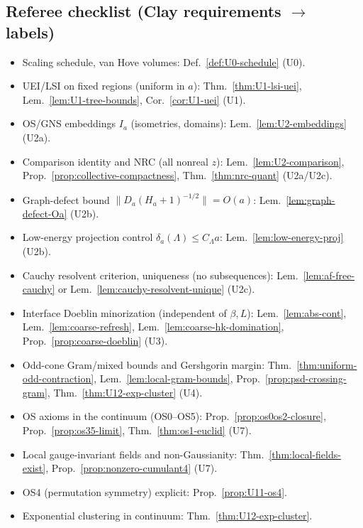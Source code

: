 \documentclass[11pt]{amsart}
\theoremstyle{plain}
\theoremstyle{definition}
\theoremstyle{remark}
\begin{document}
\subsection*{Referee checklist (Clay requirements $\to$ labels)}
\begin{itemize}
  \item Scaling schedule, van Hove volumes: Def.~\ref{def:U0-schedule} (U0).
  \item UEI/LSI on fixed regions (uniform in $a$): Thm.~\ref{thm:U1-lsi-uei}, Lem.~\ref{lem:U1-tree-bounds}, Cor.~\ref{cor:U1-uei} (U1).
  \item OS/GNS embeddings $I_a$ (isometries, domains): Lem.~\ref{lem:U2-embeddings} (U2a).
  \item Comparison identity and NRC (all nonreal $z$): Lem.~\ref{lem:U2-comparison}, Prop.~\ref{prop:collective-compactness}, Thm.~\ref{thm:nrc-quant} (U2a/U2c).
  \item Graph-defect bound $\|D_a(H_a+1)^{-1/2}\|=O(a)$: Lem.~\ref{lem:graph-defect-Oa} (U2b).
  \item Low-energy projection control $\delta_a(\Lambda)\le C_\Lambda a$: Lem.~\ref{lem:low-energy-proj} (U2b).
  \item Cauchy resolvent criterion, uniqueness (no subsequences): Lem.~\ref{lem:af-free-cauchy} or Lem.~\ref{lem:cauchy-resolvent-unique} (U2c).
  \item Interface Doeblin minorization (independent of $\beta,L$): Lem.~\ref{lem:abs-cont}, Lem.~\ref{lem:coarse-refresh}, Lem.~\ref{lem:coarse-hk-domination}, Prop.~\ref{prop:coarse-doeblin} (U3).
  \item Odd-cone Gram/mixed bounds and Gershgorin margin: Thm.~\ref{thm:uniform-odd-contraction}, Lem.~\ref{lem:local-gram-bounds}, Prop.~\ref{prop:psd-crossing-gram}, Thm.~\ref{thm:U12-exp-cluster} (U4).
  \item OS axioms in the continuum (OS0–OS5): Prop.~\ref{prop:os0os2-closure}, Prop.~\ref{prop:os35-limit}, Thm.~\ref{thm:os1-euclid} (U7).
  \item Local gauge-invariant fields and non-Gaussianity: Thm.~\ref{thm:local-fields-exist}, Prop.~\ref{prop:nonzero-cumulant4} (U7).
  \item OS4 (permutation symmetry) explicit: Prop.~\ref{prop:U11-os4}.
  \item Exponential clustering in continuum: Thm.~\ref{thm:U12-exp-cluster}.
\end{itemize}
\end{document}
